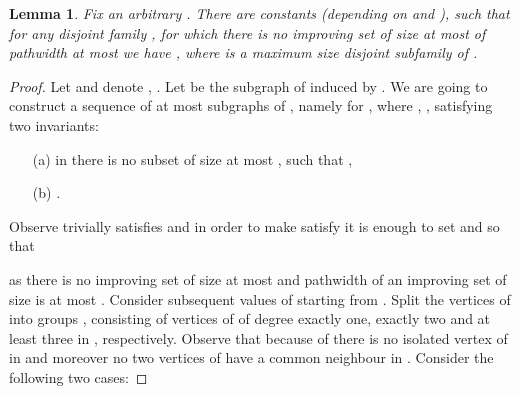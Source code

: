 \documentclass[11pt]{article}
\newtheorem{lemma}[theorem]{Lemma}
\theoremstyle{definition}
\newcommand{\writeref}[1]{\immediate\write\tempfile{\unexpanded{#1}}}
\renewcommand{\ref}[1]{\oldref{#1}\writeref{\oldref{#1} (#1)}\writeref{}}
\begin{document}
\begin{lemma}
\label{lem:analysis}
Fix an arbitrary . 
There are constants  (depending on  and ),
such that for any disjoint family ,
for which there is no improving set of size at most  of pathwidth at most 
we have ,
where  is a maximum size disjoint subfamily of .
\end{lemma}

\begin{proof}
Let  and denote , .
Let  be the subgraph of  induced by .
We are going to construct a sequence of at most  subgraphs of ,
namely  for , where , , 
satisfying two invariants:
\begin{itemize}
 \item[(a)] in  there is no subset  of size at most , such that ,
 \item[(b)] .
\end{itemize}
Observe  trivially satisfies 
and in order to make  satisfy  
it is enough to set  and  so that

as there is no improving set of size at most 
and pathwidth of an improving set of size  is at most .
Consider subsequent values of  starting from .
Split the vertices of  into groups , 
consisting of vertices of  of degree exactly one, exactly two and at least three in , respectively.
Observe that because of  there is no isolated vertex of  in 
and moreover no two vertices of  have a common neighbour in .
Consider the following two cases:
\end{proof}
\end{document}
